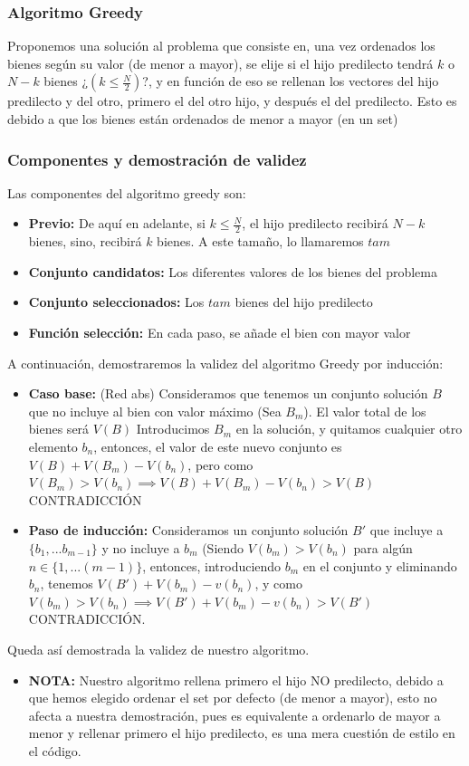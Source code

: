\documentclass{article}
\begin{document}
\subsubsection{Algoritmo Greedy}
Proponemos una solución al problema que consiste en, una vez ordenados los bienes según su valor (de menor a mayor), se elije si el hijo predilecto tendrá $k$ o $N-k$ bienes ¿$(k\leq \frac N2)$?, y en función de eso se rellenan los vectores del hijo predilecto y del otro, primero el del otro hijo, y después el del predilecto. Esto es debido a que los bienes están ordenados de menor a mayor (en un set)
\subsubsection{Componentes y demostración de validez}


Las componentes del algoritmo greedy son:

\begin{itemize}
    \item \textbf{Previo:} De aquí en adelante, si $k\leq  \frac{N}{2}$, el hijo predilecto recibirá $N-k$ bienes, sino, recibirá $k$ bienes. A este tamaño, lo llamaremos $tam$
    \item \textbf{Conjunto candidatos:} Los diferentes valores de los bienes del problema
    \item \textbf{Conjunto seleccionados:} Los $tam$ bienes del hijo predilecto
     \item \textbf{Función selección:} En cada paso, se añade el bien con mayor valor
\end{itemize}
A continuación, demostraremos la validez del algoritmo Greedy por inducción:
\begin{itemize}
    \item \textbf{Caso base:} (Red abs) Consideramos que tenemos un conjunto solución $B$ que no incluye al bien con valor máximo (Sea $B_m$). El valor total de los bienes será $V(B)$ Introducimos $B_m$ en la solución, y quitamos cualquier otro elemento $b_n$, entonces, el valor de este nuevo conjunto es $V(B) + V(B_m) - V(b_n)$, pero como $V(B_m) > V(b_n) \implies V(B)+ V(B_m) - V(b_n)  > V(B)$ CONTRADICCIÓN
    \item \textbf{Paso de inducción:} 
    Consideramos un conjunto solución $B'$ que incluye a $\{b_1,...b_{m-1}\}$ y no incluye a $b_m$ (Siendo $V(b_m) > V(b_n)$ para algún $n\in \{1,...(m-1)\}$, entonces, introduciendo $b_m$ en el conjunto y eliminando $b_n$, tenemos $V(B') + V(b_m) - v(b_n)$, y como $V(b_m) > V(b_n) \implies V(B') + V(b_m) - v(b_n) > V(B') $ CONTRADICCIÓN.
\end{itemize}
    Queda así demostrada la validez de nuestro algoritmo.
\begin{itemize}
    \item \textbf{NOTA:} Nuestro algoritmo rellena primero el hijo NO predilecto, debido a que hemos elegido ordenar el set por defecto (de menor a mayor), esto no afecta a nuestra demostración, pues es equivalente a ordenarlo de mayor a menor y rellenar primero el hijo predilecto, es una mera cuestión de estilo en el código.
\end{itemize}
\end{document}
